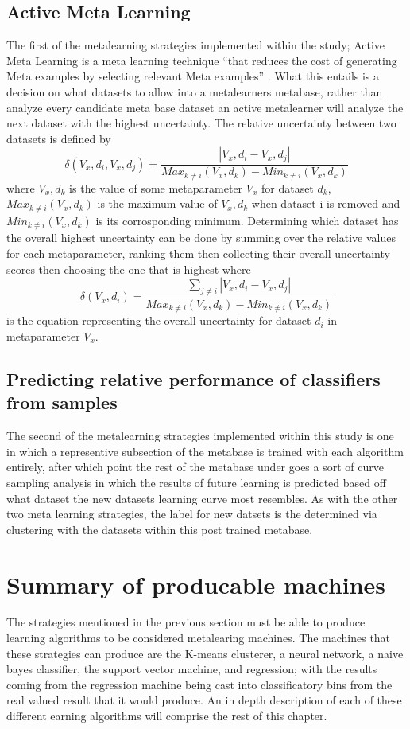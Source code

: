 \subsection{Active Meta Learning}
The first of the metalearning strategies implemented within the study; Active
Meta Learning is a meta learning technique  ``that reduces the cost of generating Meta examples
by selecting relevant Meta examples'' \cite{Bhatt}. What this entails is a decision on what
datasets to allow into a metalearners metabase, rather than analyze every candidate meta base dataset
an active metalearner will analyze the next dataset with the highest uncertainty. The relative uncertainty
between two datasets is defined by
$$\delta(V_x,d_i,V_x,d_j) = \frac{|V_x,d_i - V_x,d_j|}{Max_{k\neq i}(V_x,d_k)- Min_{k\neq i}(V_x,d_k)}$$
where $V_x,d_k$ is the value of some metaparameter $V_x$ for dataset $d_k$,
$Max_{k\neq i}(V_x,d_k)$ is the maximum value of $V_x,d_k$ when dataset i is removed and
$Min_{k\neq i}(V_x,d_k)$ is its corrosponding minimum. Determining which dataset has the overall highest
uncertainty can be done by summing over the relative values for each metaparameter, ranking them then
collecting their overall uncertainty scores then choosing the one that is highest where  $$\delta(V_x,d_i) = \frac{\sum_{j\neq i} |V_x,d_i - V_x,d_j|}{Max_{k\neq i}(V_x,d_k)- Min_{k\neq i}(V_x,d_k)}$$ is the equation
representing the overall uncertainty for dataset $d_i$ in metaparameter $V_x$.
\subsection{Predicting relative performance of classifiers from samples}
The second of the metalearning strategies implemented within this study is one in which
a representive subsection of the metabase is trained with each algorithm entirely, after
which point the rest of the metabase under goes a sort of curve sampling analysis in which
the results of future learning is predicted based off what dataset the new datasets learning
curve most resembles. \cite{Leite} As with the other two meta learning strategies, the label
for new datsets is the determined via clustering with the datasets within this post trained
metabase.

\section{Summary of producable machines}
The strategies mentioned in the previous section must be able to produce learning algorithms
to be considered metalearing machines. The machines that these strategies can produce are
the K-means clusterer, a neural network, a naive bayes classifier, the support vector machine,
and regression; with the results coming from the regression machine being cast into
classificatory bins from the real valued result that it would produce. An in depth
description of each of these different earning algorithms will comprise the rest of
this chapter.
